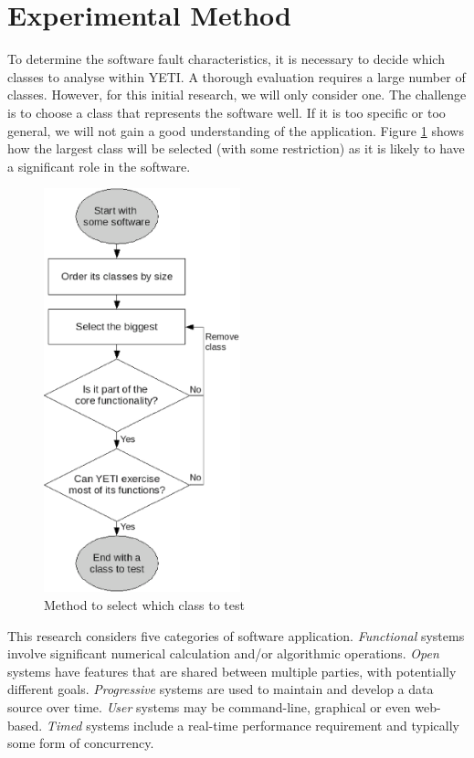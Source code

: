 \documentclass[runningheads,a4paper]{llncs}
\begin{document}
\section{Experimental Method}
To determine the software fault characteristics, it is necessary to decide which classes to analyse within YETI. A thorough evaluation requires a large number of classes. However, for this initial research, we will only consider one. The challenge is to choose a class that represents the software well. If it is too specific or too general, we will not gain a good understanding of the application. Figure \ref{flowchart} shows how the largest class will be selected (with some restriction) as it is likely to have a significant role in the software.


\begin{figure}[!h]
\centering
\includegraphics[width=57mm]{figures/flowchart.eps}
\caption{Method to select which class to test}
\label{flowchart}
\end{figure}

This research considers five categories of software application. \emph{Functional} systems involve significant numerical calculation and/or algorithmic operations. \emph{Open} systems have features that are shared between multiple parties, with potentially different goals. \emph{Progressive} systems are used to maintain and develop a data source over time. \emph{User} systems may be command-line, graphical or even web-based. \emph{Timed} systems include a real-time performance requirement and typically some form of concurrency.
\end{document}
